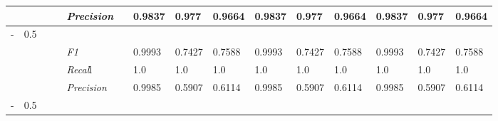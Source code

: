 \begin{table}[]
\begin{tabularx}{\textwidth}{XXlllllllllllll@{}}
                                                                    &                                                                     &                                                           &    & \textit{Precision} &                                                      & 0.9837 & 0.977 & 0.9664 & 0.9837 & 0.977 & 0.9664 & 0.9837 & 0.977 & 0.9664 \\ \midrule
- & 0.5 &  &  &                                                              &                                                                   &                                                             &                                                               &                                                                    &                                                              &                                                               &                                                                    &                                                              \\
                                                                    &                                                                     &                                                           &    & \textit{F1} &                                                      & 0.9993        & 0.7427        & 0.7588        & 0.9993        & 0.7427        & 0.7588        & 0.9993        & 0.7427        & 0.7588        \\
                                                                    &                                                                     &                                                           &    & \textit{Recal}l &                                                      & 1.0    & 1.0    & 1.0    & 1.0    & 1.0    & 1.0    & 1.0    & 1.0    & 1.0    \\
                                                                    &                                                                     &                                                           &    & \textit{Precision} &                                                      & 0.9985 & 0.5907 & 0.6114 & 0.9985 & 0.5907 & 0.6114 & 0.9985 & 0.5907 & 0.6114 \\ \midrule
- & 0.5 &  &  &                                                              &                                                                   &                                                             &                                                               &                                                                    &                                                              &                                                               &                                                                    &                                                              \\

\end{tabularx}
\end{table}
